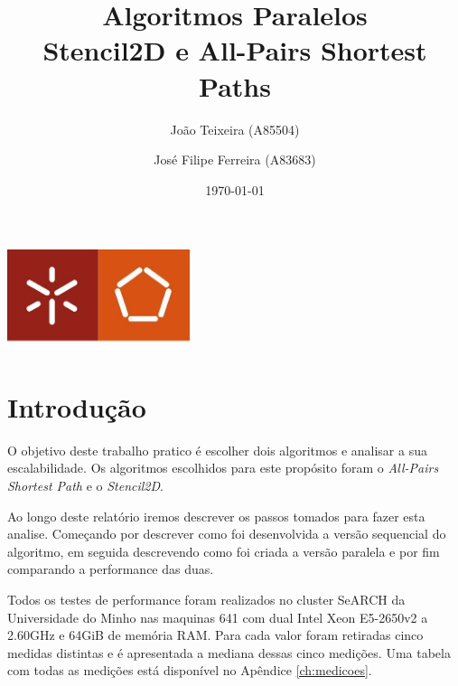 \documentclass[a4paper]{report}
\begin{document}
\title{Algoritmos Paralelos\\Stencil2D e All-Pairs Shortest Paths}
\author{João Teixeira (A85504) \and José Filipe Ferreira (A83683)}
\date{\today}

\begin{center}
    \begin{minipage}{0.75\linewidth}
        \centering
        \includegraphics[width=0.4\textwidth]{images/eng.jpeg}\par\vspace{1cm}
        \vspace{1.5cm}
        \href{https://www.uminho.pt/PT}
        {\color{black}{\scshape\LARGE Universidade do Minho}} \par
        \vspace{1cm}
        \href{https://www.di.uminho.pt/}
        {\color{black}{\scshape\Large Departamento de Informática}} \par
        \vspace{1.5cm}
        \maketitle
    \end{minipage}
\end{center}

\tableofcontents

\chapter{Introdução}

O objetivo deste trabalho pratico é escolher dois algoritmos e analisar a sua
escalabilidade. Os algoritmos escolhidos para este propósito foram o
\textit{All-Pairs Shortest Path} e o \textit{Stencil2D}.

Ao longo deste relatório iremos descrever os passos tomados para fazer esta
analise. Começando por descrever como foi desenvolvida a versão sequencial do
algoritmo, em seguida descrevendo como foi criada a versão paralela e por fim
comparando a performance das duas.

Todos os testes de performance foram realizados no cluster SeARCH da
Universidade do Minho nas maquinas 641 com dual Intel Xeon E5-2650v2 a 2.60GHz e
64GiB de memória RAM. Para cada valor foram retiradas cinco medidas distintas e é
apresentada a mediana dessas cinco medições. Uma tabela com todas as medições
está disponível no Apêndice \ref{ch:medicoes}.
\end{document}
